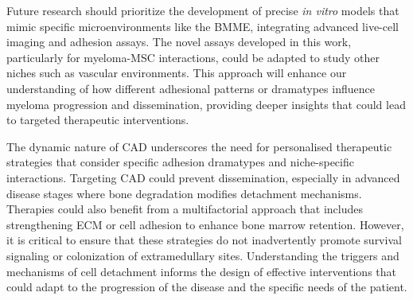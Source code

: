 Future research should prioritize the development of precise \textit{in vitro}
models that mimic specific microenvironments like the \ac{BMME}, integrating
advanced live-cell imaging and adhesion assays. The novel assays developed in
this work, particularly for myeloma-MSC interactions, could be adapted to study
other niches such as vascular environments. This approach will enhance our
understanding of how different adhesional patterns or dramatypes influence
myeloma progression and dissemination, providing deeper insights that could lead
to targeted therapeutic interventions.

The dynamic nature of \ac{CAD} underscores the need for personalised therapeutic
strategies that consider specific adhesion dramatypes and niche-specific
interactions. Targeting \ac{CAD} could prevent dissemination, especially in
advanced disease stages where bone degradation modifies detachment mechanisms.
Therapies could also benefit from a multifactorial approach that includes
strengthening \ac{ECM} or cell adhesion to enhance bone marrow retention.
However, it is critical to ensure that these strategies do not inadvertently
promote survival signaling or colonization of extramedullary sites.
Understanding the triggers and mechanisms of cell detachment informs the design
of effective interventions that could adapt to the progression of the disease
and the specific needs of the patient.

